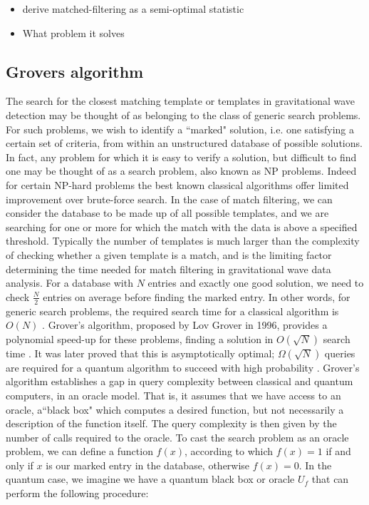 \documentclass[aps,prd,nofootinbib,twocolumn,reprint,superscriptaddress,showpacs,showkeys,longbibliography]{revtex4-1}
\begin{document}
\begin{itemize}
\item derive matched-filtering as a semi-optimal statistic
\item What problem it solves
\end{itemize}

\subsection{Grovers algorithm}

The search for the closest matching template or templates in gravitational wave detection may be thought of as belonging to the class of generic search problems. For such problems, we wish to identify a ``marked" solution, i.e. one satisfying a certain set of criteria, from within an unstructured database of possible solutions. In fact, any problem for which it is easy to verify a solution, but difficult to find one may be thought of as a search problem, also known as NP problems. Indeed for certain NP-hard problems the best known classical algorithms offer limited improvement over brute-force search.\cite{bennett1997strengths} In the case of match filtering, we can consider the database to be made up of all possible templates, and we are searching for one or more for which the match with the data is above a specified threshold. Typically the number of templates is much larger than the complexity of checking whether a given template is a match, and is the limiting factor determining the time needed for match filtering in gravitational wave data analysis. For a database with $N$ entries and exactly one good solution, we need to check $\frac{N}{2}$ entries on average before finding the marked entry. In other words, for generic search problems, the required search time for a classical algorithm is $O(N)$ \cite{barnett2009quantum}. Grover's algorithm, proposed by Lov Grover in 1996, provides a polynomial speed-up for these problems, finding a solution in $O(\sqrt{N})$ search time \cite{grover1996fast}. It was later proved that this is asymptotically optimal; $\Omega(\sqrt{N})$ queries are required for a quantum algorithm to succeed with high probability \cite{bennett1997strengths}.
\newline\newline Grover's algorithm establishes a gap in query complexity between classical and quantum computers, in an oracle model. That is, it assumes that we have access to an oracle, a``black box" which computes a desired function, but not necessarily a description of the function itself. The query complexity is then given by the number of calls required to the oracle. To cast the search problem as an oracle problem, we can define a function $f(x)$, according to which $f(x)=1$ if and only if $x$ is our marked entry in the database, otherwise $f(x)=0$. In the quantum case, we imagine we have a quantum black box or oracle $U_f$ that can perform the following procedure:
\end{document}
